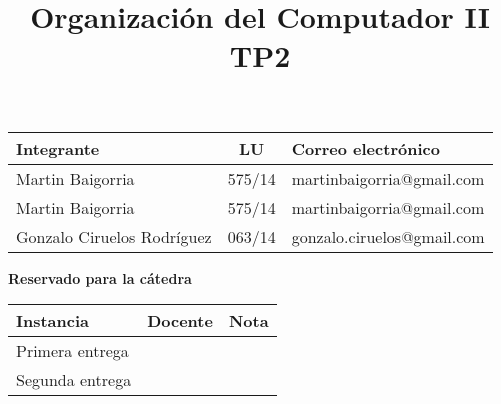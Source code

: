 \documentclass[10pt,a4paper]{article}
\title{Organización del Computador II \\ TP2}
\begin{document}

\maketitle

\bigskip

\begin{table}[h]
\centering
\begin{tabular}{|l l l|}
\hline
Integrante       & \multicolumn{1}{c}{LU}     & Correo electrónico        \\ \hline
Martin Baigorria & \multicolumn{1}{c}{575/14} & martinbaigorria@gmail.com \\ 
Martin Baigorria & 575/14                      & martinbaigorria@gmail.com \\
Gonzalo Ciruelos Rodríguez & 063/14           & gonzalo.ciruelos@gmail.com \\ \hline
\end{tabular}
\end{table}

\vfill

\begin{center}
\textbf{Reservado para la cátedra}
\end{center}
\begin{table}[h]
\centering
\begin{tabular}{|l|l|l|}
\hline
Instancia       & Docente & Nota \\ \hline
Primera entrega &         &      \\ \hline
Segunda entrega &         &      \\ \hline
\end{tabular}
\end{table}


\tableofcontents


\pagebreak


\newpage


\newpage


\newpage


\newpage


\newpage


\newpage


\newpage

\end{document}
